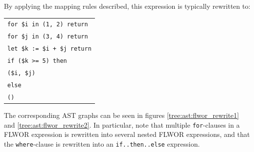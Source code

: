 By applying the mapping rules described,  this expression is typically
rewritten to:
%
\begin{center}
\begin{tabular}{l}
\texttt{for \$i in (1, 2) return} \\ \quad
  \texttt{for \$j in (3, 4) return} \\ \quad
    \texttt{let \$k := \$i + \$j return} \\ \quad \quad
      \texttt{if (\$k >= 5) then} \\ \quad \quad \quad
        \texttt{(\$i, \$j)}\\ \quad \quad
      \texttt{else} \\ \quad \quad \quad
        \texttt{()}
\end{tabular}
\end{center}
The corresponding AST graphs can be seen in figures
\ref{tree:ast:flwor_rewrite1} and \ref{tree:ast:flwor_rewrite2}. In particular,
note that multiple \texttt{for}-clauses in a FLWOR expression is rewritten into several
nested FLWOR expressions, and that the \texttt{where}-clause is  rewritten into an
\texttt{if..then..else} expression. 
\newpage
